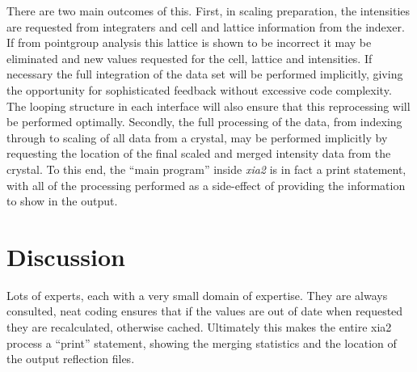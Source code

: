 \documentclass[preprint,pdf]{iucr}
\begin{document}
There are two main outcomes of this. First, in scaling preparation, 
the intensities are requested from integraters and cell and lattice
information from the indexer. If from pointgroup analysis this
lattice is shown to be incorrect it may be eliminated and new
values requested for the cell, lattice and intensities. If necessary
the full integration of the data set will be performed implicitly,
giving the opportunity for sophisticated feedback without excessive
code complexity. The looping structure in each interface will also
ensure that this reprocessing will be performed optimally.
Secondly, the full processing
of the data, from indexing through to scaling of all data from a
crystal, may be performed implicitly by requesting the location of the
final scaled and merged intensity data from the crystal. To this end,
the ``main program'' inside \emph{xia2} is in fact a print statement,
with all of the processing performed as a side-effect of providing the
information to show in the output.

\section{Discussion}

Lots of experts, each with a very small domain of expertise. They are
always consulted, neat coding ensures that if the values are out of
date when requested they are recalculated, otherwise
cached. Ultimately this makes the entire xia2 process a ``print''
statement, showing the merging statistics and the location of the
output reflection files.
\end{document}

